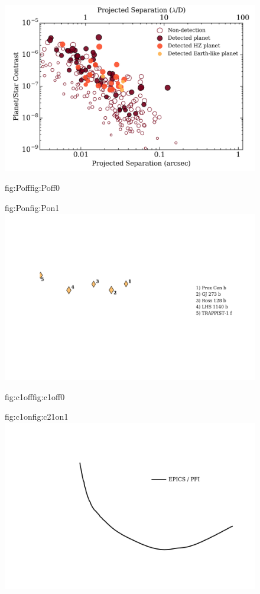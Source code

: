 \begin{figure}
  \centering
  \includegraphics[width=0.8\hsize]{figures/SPIRoudet_contrast_bkgd.png}%
  \hspace{-0.8\hsize}%
  \begin{ocg}{fig:Poff}{fig:Poff}{0}%
  \end{ocg}%
  \begin{ocg}{fig:Pon}{fig:Pon}{1}%
   \includegraphics[width=0.8\hsize]{figures/SPIRoudet_contrast_planets.png}%
  \end{ocg}
  \hspace{-0.8\hsize}%
  \begin{ocg}{fig:c1off}{fig:c1off}{0}%
  \end{ocg}%
  \begin{ocg}{fig:c1on}{fig:c21on}{1}%
   \includegraphics[width=0.8\hsize]{figures/SPIRoudet_contrast_curve1.png}%

\end{ocg}
\end{figure}
